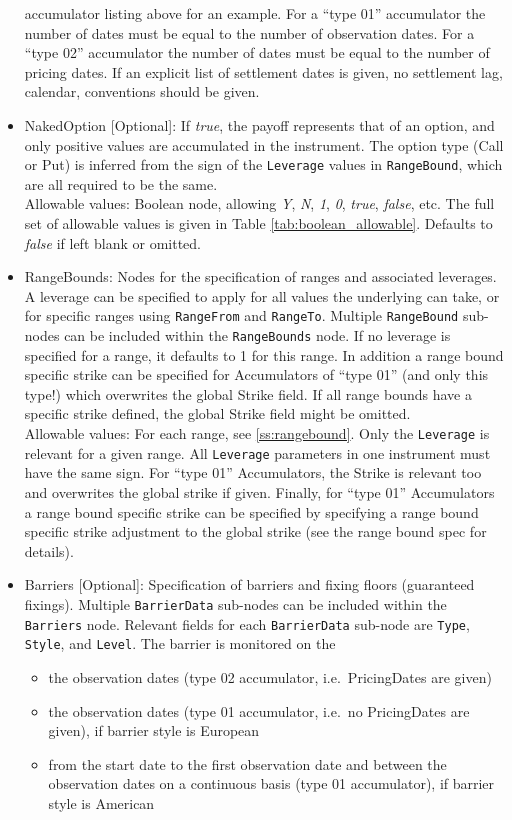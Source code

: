 \begin{itemize}
  accumulator listing above for an example. For a ``type 01'' accumulator the number of dates must be equal to the
  number of observation dates. For a ``type 02'' accumulator the number of dates must be equal to the number of pricing
  dates. If an explicit list of settlement dates is given, no settlement lag, calendar, conventions should be given.
\item NakedOption [Optional]: If \emph{true}, the payoff represents that of an option, and only positive values are accumulated in the instrument. The option type (Call or Put) is inferred from the sign of the \lstinline!Leverage! values in \lstinline!RangeBound!, which are all required to be the same.\\
  Allowable values: Boolean node, allowing \emph{Y}, \emph{N}, \emph{1}, \emph{0}, \emph{true}, \emph{false}, etc.
  The full set of allowable values is given in Table \ref{tab:boolean_allowable}. Defaults to \emph{false} if left blank or omitted.
\item RangeBounds: Nodes for the specification of ranges and associated leverages. A leverage can be specified to apply for all values the underlying can take, or for specific ranges using \lstinline!RangeFrom! and \lstinline!RangeTo!. Multiple \lstinline!RangeBound! sub-nodes can be included within the \lstinline!RangeBounds! node. If no leverage is specified for a range, it defaults to 1 for this range. In addition a range bound specific strike can be specified for Accumulators of ``type 01'' (and only this type!) which overwrites the global Strike field. If all range bounds have a specific strike defined, the global Strike field might be omitted. \\
    Allowable values: For each range, see \ref{ss:rangebound}. Only the \lstinline!Leverage! is relevant for a given range. All \lstinline!Leverage! parameters in one instrument must have the same sign. For ``type 01'' Accumulators, the Strike is relevant too and overwrites the global strike if given. Finally, for ``type 01'' Accumulators a range bound specific strike can be specified by specifying a range bound specific strike adjustment to the global strike (see the range bound spec for details).
\item Barriers [Optional]: Specification of barriers and fixing floors (guaranteed fixings). Multiple \lstinline!BarrierData! sub-nodes can be included within the \lstinline!Barriers! node. Relevant fields for each \lstinline!BarrierData! sub-node are \lstinline!Type!, \lstinline!Style!, and \lstinline!Level!.  The barrier is monitored on the
  \begin{itemize}
    \item the observation dates (type 02 accumulator, i.e.\ PricingDates are given)
    \item the observation dates (type 01 accumulator, i.e.\ no PricingDates are given), if barrier style is European
    \item from the start date to the first observation date and between the observation dates on a continuous basis
      (type 01 accumulator), if barrier style is American
  \end{itemize}


\end{itemize}
